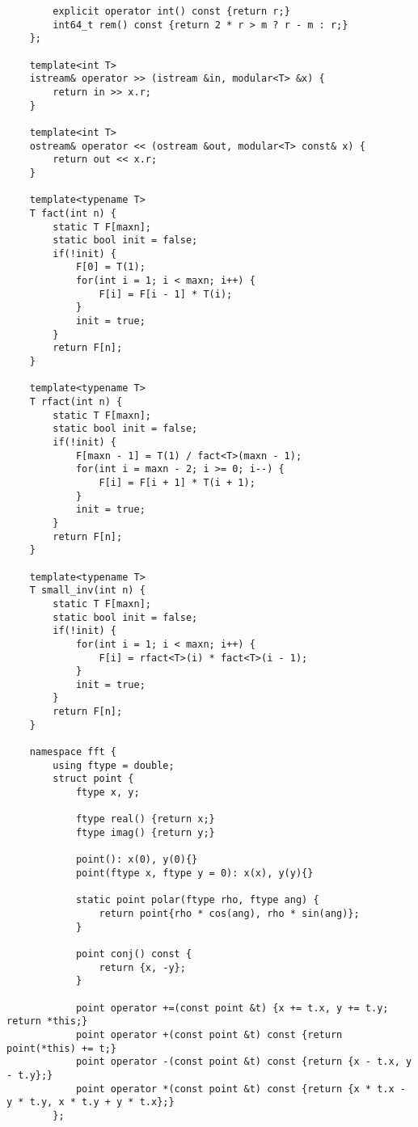 \begin{lstlisting}
        explicit operator int() const {return r;}
        int64_t rem() const {return 2 * r > m ? r - m : r;}
    };
    
    template<int T>
    istream& operator >> (istream &in, modular<T> &x) {
        return in >> x.r;
    }
    
    template<int T>
    ostream& operator << (ostream &out, modular<T> const& x) {
        return out << x.r;
    }
    
    template<typename T>
    T fact(int n) {
        static T F[maxn];
        static bool init = false;
        if(!init) {
            F[0] = T(1);
            for(int i = 1; i < maxn; i++) {
                F[i] = F[i - 1] * T(i);
            }
            init = true;
        }
        return F[n];
    }
    
    template<typename T>
    T rfact(int n) {
        static T F[maxn];
        static bool init = false;
        if(!init) {
            F[maxn - 1] = T(1) / fact<T>(maxn - 1);
            for(int i = maxn - 2; i >= 0; i--) {
                F[i] = F[i + 1] * T(i + 1);
            }
            init = true;
        }
        return F[n];
    }

    template<typename T>
    T small_inv(int n) {
        static T F[maxn];
        static bool init = false;
        if(!init) {
            for(int i = 1; i < maxn; i++) {
                F[i] = rfact<T>(i) * fact<T>(i - 1);
            }
            init = true;
        }
        return F[n];
    }

    namespace fft {
        using ftype = double;
        struct point {
            ftype x, y;
            
            ftype real() {return x;}
            ftype imag() {return y;}
            
            point(): x(0), y(0){}
            point(ftype x, ftype y = 0): x(x), y(y){}
            
            static point polar(ftype rho, ftype ang) {
                return point{rho * cos(ang), rho * sin(ang)};
            }
            
            point conj() const {
                return {x, -y};
            }
            
            point operator +=(const point &t) {x += t.x, y += t.y; return *this;}
            point operator +(const point &t) const {return point(*this) += t;}
            point operator -(const point &t) const {return {x - t.x, y - t.y};}
            point operator *(const point &t) const {return {x * t.x - y * t.y, x * t.y + y * t.x};}
        };


\end{lstlisting}
